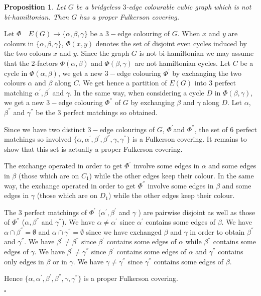 \documentclass{amsart}
\newtheorem{prop}[thm]{Proposition}
\theoremstyle{definition}
\theoremstyle{remark}
\newenvironment{prf}{{\bf \noindent Proof } }{\hfill$\square$\\}
\begin{document}
\begin{prop} \label{Proposition:PropernonHamiltonian}
Let $G$ be a bridgeless $3$-edge colourable cubic graph which is not bi-hamiltonian. Then $G$ has a
proper Fulkerson covering.
\end{prop}
\begin{prf}
Let $\Phi \quad E(G) \rightarrow \{\alpha,\beta,\gamma\}$ be a  $3-$edge
colouring of $G$. When $x$ and $y$ are colours in
$\{\alpha,\beta,\gamma\}$,  $ \Phi(x, y)$ denotes the set of disjoint
even cycles induced by the two colours $x$ and $y$.
\newline Since the graph $G$ is not bi-hamiltonian we may assume that the
$2$-factors $\Phi(\alpha,\beta)$ and $\Phi(\beta,\gamma)$ are not hamiltonian
cycles.
Let $C$ be a
cycle in $\Phi(\alpha,\beta)$, we get a new $3-$edge colouring
$\Phi^{'}$ by exchanging the two colours $\alpha$ and $\beta$ along
$C$. We get hence a partition of $E(G)$ into $3$ perfect matching
$\alpha^{'},\beta^{'}$ and $\gamma$. In the same way, when
considering a cycle $D$ in $\Phi(\beta,\gamma)$, we get a new
$3-$edge colouring $\Phi^{''}$ of $G$ by exchanging $\beta$ and
$\gamma$ along $D$. Let $\alpha$,$\beta^{''}$ and $\gamma^{''}$ be
the $3$ perfect matchings so obtained.

Since we have two distinct $3-$edge colourings of $G$,
$\Phi^{'}$and $\Phi^{''}$, the set of $6$ perfect matchings so
involved
$\{\alpha,\alpha^{'},\beta^{'},\beta^{''},\gamma,\gamma^{''}\}$ is a
Fulkerson covering. It remains to show that this set is actually a
proper Fulkerson covering.

The exchange operated in
order to get $\Phi^{'}$ involve some edges in $\alpha$ and some
edges in $\beta$ (those which are on $C_{1}$) while the other edges
keep their colour. In the same way,  the exchange operated in order
to get $\Phi^{''}$ involve some edges in $\beta$ and some edges in
$\gamma$ (those which are on $D_{1}$) while the other edges keep
their colour.

The $3$ perfect matchings of $\Phi^{'}$ ($\alpha^{'},\beta^{'}$ and
$\gamma$ ) are pairwise disjoint as well as those of $\Phi^{''}$
($\alpha,\beta^{''}$ and $\gamma^{''}$).  We have $\alpha \not =
\alpha^{'}$ since $\alpha^{'}$ contains some edges of $\beta$. We
have $\alpha \cap \beta^{''}=\emptyset$ and $\alpha \cap
\gamma^{''}=\emptyset$ since we have exchanged $\beta$ and $\gamma$
in order to obtain $\beta^{''}$ and $\gamma^{''}$. We have
$\beta^{'} \not = \beta^{''}$ since $\beta^{'}$ contains some edges
of $\alpha$ while $\beta^{''}$ contains some edges of $\gamma$. We
have $\beta^{'} \not = \gamma^{''}$ since $\beta^{'}$ contains some
edges of $\alpha$ and $\gamma^{''}$ contains only edges in $\beta$
or in $\gamma$. We have $\gamma \not = \gamma^{''}$ since
$\gamma^{''}$ contains some edges of $\beta$.

Hence
$\{\alpha,\alpha^{'},\beta^{'},\beta^{''},\gamma,\gamma^{''}\}$ is a
proper Fulkerson covering.

\end{prf}
\end{document}

